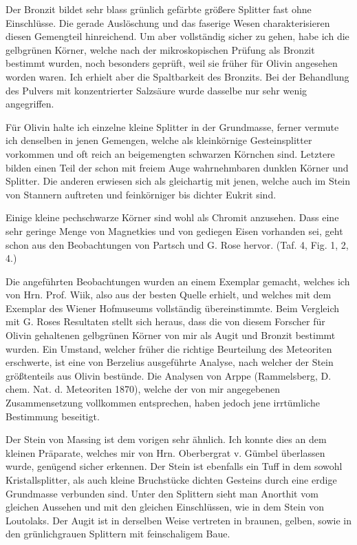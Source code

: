 \documentclass[a4paper, 12pt, oneside]{article}
\begin{document}
Der Bronzit bildet sehr blass grünlich gefärbte größere Splitter fast ohne Einschlüsse. Die gerade Auslöschung und das faserige Wesen charakterisieren diesen Gemengteil hinreichend. Um aber vollständig sicher zu gehen, habe ich die gelbgrünen Körner, welche nach der mikroskopischen Prüfung als Bronzit bestimmt wurden, noch besonders geprüft, weil sie früher für Olivin angesehen worden waren. Ich erhielt aber die Spaltbarkeit des Bronzits. Bei der Behandlung des Pulvers mit konzentrierter Salzsäure wurde dasselbe nur sehr wenig angegriffen.

Für Olivin halte ich einzelne kleine Splitter in der Grundmasse, ferner vermute ich denselben in jenen Gemengen, welche als kleinkörnige Gesteinsplitter vorkommen und oft reich an beigemengten schwarzen Körnchen sind. Letztere bilden einen Teil der schon mit freiem Auge wahrnehmbaren dunklen Körner und Splitter. Die anderen erwiesen sich als gleichartig mit jenen, welche auch im Stein von Stannern auftreten und feinkörniger bis dichter Eukrit sind.

Einige kleine pechschwarze Körner sind wohl als Chromit anzusehen. Dass eine sehr geringe Menge von Magnetkies und von gediegen Eisen vorhanden sei, geht schon aus den Beobachtungen von Partsch und G. Rose hervor. (Taf. 4, Fig. 1, 2, 4.)

Die angeführten Beobachtungen wurden an einem Exemplar gemacht, welches ich von Hrn. Prof. Wiik, also aus der besten Quelle erhielt, und welches mit dem Exemplar des Wiener Hofmuseums vollständig übereinstimmte. Beim Vergleich mit G. Roses Resultaten stellt sich heraus, dass die von diesem Forscher für Olivin gehaltenen gelbgrünen Körner von mir als Augit und Bronzit bestimmt wurden. Ein Umstand, welcher früher die richtige Beurteilung des Meteoriten erschwerte, ist eine von Berzelius ausgeführte Analyse, nach welcher der Stein größtenteils aus Olivin bestünde. Die Analysen von Arppe (Rammelsberg, D. chem. Nat. d. Meteoriten 1870), welche der von mir angegebenen Zusammensetzung vollkommen entsprechen, haben jedoch jene irrtümliche Bestimmung beseitigt.

Der Stein von Massing ist dem vorigen sehr ähnlich. Ich konnte dies an dem kleinen Präparate, welches mir von Hrn. Oberbergrat v. Gümbel überlassen wurde, genügend sicher erkennen. Der Stein ist ebenfalls ein Tuff in dem sowohl Kristallsplitter, als auch kleine Bruchstücke dichten Gesteins durch eine erdige Grundmasse verbunden sind. Unter den Splittern sieht man Anorthit vom gleichen Aussehen und mit den gleichen Einschlüssen, wie in dem Stein von Loutolaks. Der Augit ist in derselben Weise vertreten in braunen, gelben, sowie in den grünlichgrauen Splittern mit feinschaligem Baue.
\end{document}
